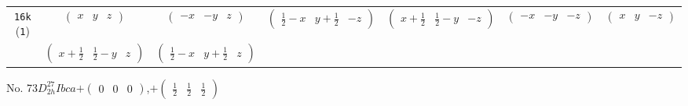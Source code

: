 \documentclass[fleqn,9pt,landscape]{jsarticle}
\begin{document}
\begin{center}
\begin{longtable}{ccccccc}
{\tt 16k} ({\tt 1}) & $ \begin{pmatrix} x & y & z \end{pmatrix} $ & $ \begin{pmatrix} - x & - y & z \end{pmatrix} $ & $ \begin{pmatrix} \frac{1}{2} - x & y + \frac{1}{2} & - z \end{pmatrix} $ & $ \begin{pmatrix} x + \frac{1}{2} & \frac{1}{2} - y & - z \end{pmatrix} $ & $ \begin{pmatrix} - x & - y & - z \end{pmatrix} $ & $ \begin{pmatrix} x & y & - z \end{pmatrix} $ \\
& $ \begin{pmatrix} x + \frac{1}{2} & \frac{1}{2} - y & z \end{pmatrix} $ & $ \begin{pmatrix} \frac{1}{2} - x & y + \frac{1}{2} & z \end{pmatrix} $ & $  $ & $  $ & $  $ & $  $ \\
\end{longtable}
\end{center}
\newpage
No. 73\quad$D_{2h}^{27}$\quad$Ibca$\quad[ orthorhombic ]\quad$+\begin{pmatrix} 0 & 0 & 0 \end{pmatrix}$,\quad $+\begin{pmatrix} \frac{1}{2} & \frac{1}{2} & \frac{1}{2} \end{pmatrix}$
\end{document}

